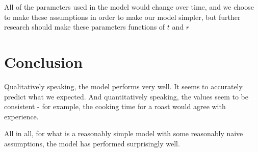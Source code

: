 \documentclass{report}
\begin{document}
All of the parameters used in the model would change over time, and we choose to make these assumptions in order to make 
our model simpler, but further research should make these parameters functions of $t$ and $r$\bigskip



\section{Conclusion}


Qualitatively speaking, the model performs very well. It seems to accurately predict what we expected. And quantitatively 
speaking, the values seem to be consistent - for example, the cooking time for a roast would agree with experience.\bigskip

All in all, for what is a reasonably simple model with some reasonably naive assumptions, the model has performed surprisingly 
well. 













{}
\end{document}
